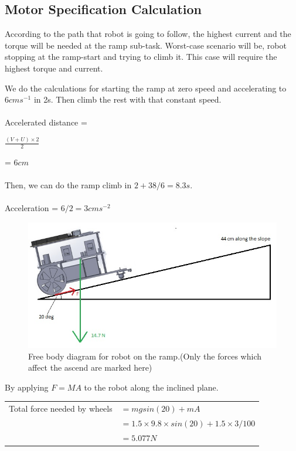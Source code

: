 \documentclass[a4paper, 12pt]{article}
\begin{document}
\subsection*{Motor Specification Calculation}

According to the path that robot is going to follow, the highest current and the torque will be needed at the ramp sub-task. Worst-case scenario will be, robot stopping at the ramp-start and trying to climb it. This case will require the highest torque and current. \par

We do the calculations for starting the ramp at zero speed and accelerating to $6cms^{-1}$ in 2s. Then climb the rest with that constant speed.\\
\\
Accelerated distance = \begin{Large}$\frac{(V+U)\times2}{2}$\end{Large} = $6 cm$\\
\\
Then, we can do the ramp climb in $2 + 38/6 = 8.3 s$.\\
\\
Acceleration =  $6/2 = 3cms^{-2}$\\
\begin{figure}[h]
    \centering
    \includegraphics[scale = 0.8]{images/WhatsApp Image 2020-05-07 at 13.20.09.jpeg}
    \caption{Free body diagram for robot on the ramp.(Only the forces which affect the ascend are marked here)}
    \label{fig:my_label}
\end{figure}
By applying $F=MA$ to the robot along the inclined plane.\\
\begin{tabular}{l l}
  Total force needed by wheels   & $ = mg sin(20) + mA$\\
			                     & $= 1.5\times9.8\times sin(20) + 1.5 \times 3/100$\\
			                   &  $= 5.077 N$\\ 
     
\end{tabular}\\
\end{document}
